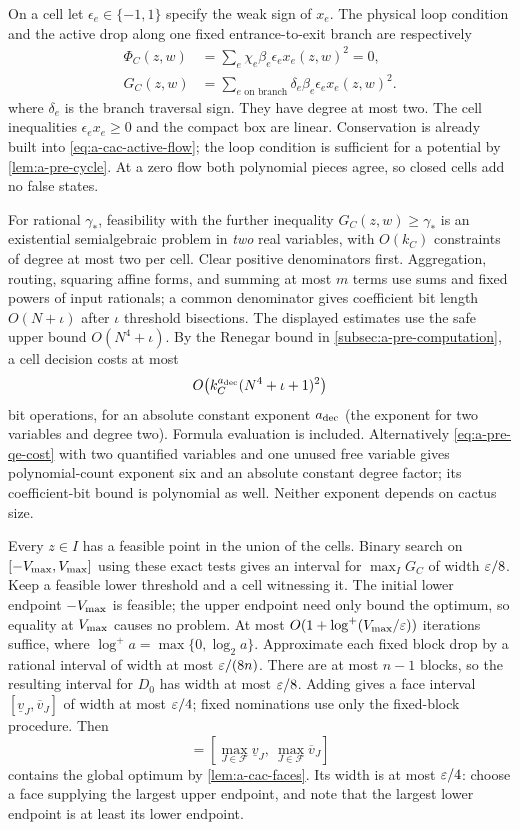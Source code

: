 On a cell let $\epsilon_e\in\{-1,1\}$ specify the weak sign of $x_e$.
The physical loop condition and the active drop along one fixed
entrance-to-exit branch are respectively
\[
 \begin{aligned}
 \Phi_C(z,w)&=\sum_e\chi_e\beta_e\epsilon_ex_e(z,w)^2=0,\\
 G_C(z,w)&=\sum_{e\text{ on branch}}\delta_e\beta_e\epsilon_ex_e(z,w)^2.
 \end{aligned}
\]
where $\delta_e$ is the branch traversal sign. They have degree at most
two. The cell inequalities $\epsilon_ex_e\ge0$ and the compact box are
linear. Conservation is already built into
\cref{eq:a-cac-active-flow}; the loop condition is sufficient for a
potential by \cref{lem:a-pre-cycle}. At a zero flow both polynomial
pieces agree, so closed cells add no false states.

For rational $\gamma_*$, feasibility with the further inequality $G_C(z,w)\ge\gamma_*$
is an existential semialgebraic problem in \emph{two} real variables,
with $O(k_C)$ constraints of degree at most two per cell. Clear positive
denominators first. Aggregation, routing, squaring affine forms, and
summing at most $m$ terms use sums and fixed powers of input rationals;
a common denominator gives coefficient bit length $O(N+\iota)$ after
$\iota$ threshold bisections. The displayed estimates use the safe
upper bound $O(N^4+\iota)$. By the Renegar bound
in \cref{subsec:a-pre-computation}, a cell decision costs at most
\[
 O\bigl(k_C^{a_{\rm dec}}(N^4+\iota+1)^2\bigr)
\]
bit operations, for an absolute constant exponent $a_{\rm dec}$ (the exponent
for two variables and degree two). Formula evaluation is included.
Alternatively \cref{eq:a-pre-qe-cost} with two quantified variables and
one unused free variable gives polynomial-count exponent six and an
absolute constant degree factor; its coefficient-bit bound is polynomial
as well. Neither exponent depends on cactus size.

Every $z\in I$ has a feasible point in the union of the cells. Binary
search on $[-V_{\max},V_{\max}]$ using these exact tests gives an interval for
$\max_I G_C$ of width $\varepsilon/8$. Keep a feasible lower threshold and a
cell witnessing it. The initial lower endpoint $-V_{\max}$ is feasible; the
upper endpoint need only bound the optimum, so equality at $V_{\max}$ causes
no problem. At most $O(1+\log^+(V_{\max}/\varepsilon))$ iterations suffice, where
$\log^+ a=\max\{0,\log_2 a\}$.
Approximate each fixed block drop by a rational interval of width at
most $\varepsilon/(8n)$. There are at most $n-1$ blocks, so the resulting
interval for $D_0$ has width at most $\varepsilon/8$. Adding gives a face
interval $[\underline v_J,\overline v_J]$ of width at most $\varepsilon/4$;
fixed nominations use only the fixed-block procedure. Then
\begin{equation}
 [\underline v,\overline v]
       =[\max_{J\in\mathcal F}\underline v_J,\ \max_{J\in\mathcal F}\overline v_J]
 \label{eq:a-cac-interval}
\end{equation}
contains the global optimum by \cref{lem:a-cac-faces}. Its width is
at most $\varepsilon/4$: choose a face supplying the largest upper endpoint,
and note that the largest lower endpoint is at least its lower endpoint.

